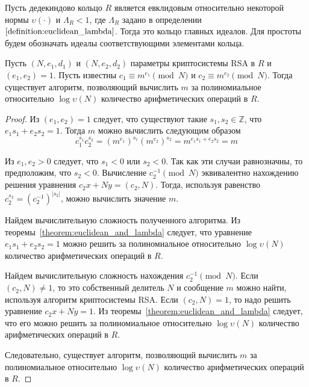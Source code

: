 \documentclass[_00_dissertation.tex]{subfiles}
\begin{document}
\begin{theorem}
    Пусть дедекиндово кольцо $R$ является евклидовым относительно некоторой нормы $\upsilon(\cdot)$ и $\Lambda_{R} < 1$, где $\Lambda_{R}$ задано в определении~$\ref{definition:euclidean_lambda}$.
    Тогда это кольцо главных идеалов.
    Для простоты будем обозначать идеалы соответствующими элементами кольца.

    Пусть $(N, e_1, d_1)$ и $(N, e_2, d_2)$ параметры криптосистемы RSA в $R$ и $(e_1, e_2) = 1$.
    Пусть известны $c_1 \equiv m^{e_1} \pmod{N}$ и $c_2 \equiv m^{e_2} \pmod{N}$.
    Тогда существует алгоритм, позволяющий вычислить $m$ за полиномиальное относительно $\log \upsilon(N)$ количество арифметических операций в $R$.
\end{theorem}
\begin{proof}
    Из $(e_1, e_2) = 1$ следует, что существуют такие $s_1, s_2 \in \mathbb{Z}$, что $e_1 s_1 + e_2 s_2 = 1$.
    Тогда $m$ можно вычислить следующим образом
    \begin{equation*}
        c_1^{s_1}c_2^{s_2} = (m^{e_1})^{s_1} (m^{e_2})^{s_2} = m^{e_1 s_1 + e_2 s_2} = m
    \end{equation*}

    Из $e_1, e_2 > 0$ следует, что $s_1 < 0$ или $s_2 < 0$.
    Так как эти случаи равнозначны, то предположим, что $s_2 < 0$.
    Вычисление $c_2^{-1} \pmod{N}$ эквивалентно нахождению решения уравнения $c_2 x + N y = (c_2, N)$.
    Тогда, используя равенство $c_2^{s_2} = (c_2^{-1})^{|s_2|}$, можно вычислить значение $m$.

    Найдем вычислительную сложность полученного алгоритма.
    Из теоремы~\ref{theorem:euclidean_and_lambda} следует, что уравнение $e_1 s_1 + e_2 s_2 = 1$ можно решить за полиномиальное относительно $\log \upsilon(N)$ количество арифметических операций в $R$.

    Найдем вычислительную сложность нахождения $c_2^{-1} \pmod{N}$.
    Если $(c_2, N) \neq 1$, то это собственный делитель $N$ и сообщение $m$ можно найти, используя алгоритм криптосистемы RSA.
    Если $(c_2, N) = 1$, то надо решить уравнение $c_2 x + N y = 1$.
    Из теоремы~\ref{theorem:euclidean_and_lambda} следует, что его можно решить за полиномиальное относительно $\log \upsilon(N)$ количество арифметических операций в $R$.

    Следовательно, существует алгоритм, позволяющий вычислить $m$ за полиномиальное относительно $\log \upsilon(N)$ количество арифметических операций в $R$.
\end{proof}
\end{document}
